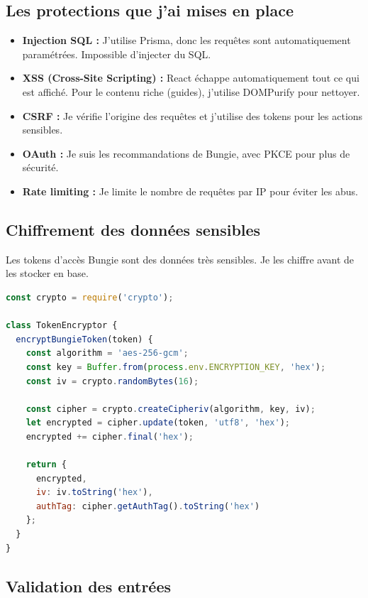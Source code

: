 \subsection{Les protections que j'ai mises en place}

\begin{itemize}
    \item \textbf{Injection SQL :} J'utilise Prisma, donc les requêtes sont automatiquement paramétrées. Impossible d'injecter du SQL.
    \item \textbf{XSS (Cross-Site Scripting) :} React échappe automatiquement tout ce qui est affiché. Pour le contenu riche (guides), j'utilise DOMPurify pour nettoyer.
    \item \textbf{CSRF :} Je vérifie l'origine des requêtes et j'utilise des tokens pour les actions sensibles.
    \item \textbf{OAuth :} Je suis les recommandations de Bungie, avec PKCE pour plus de sécurité.
    \item \textbf{Rate limiting :} Je limite le nombre de requêtes par IP pour éviter les abus.
\end{itemize}

\subsection{Chiffrement des données sensibles}

Les tokens d'accès Bungie sont des données très sensibles. Je les chiffre avant de les stocker en base.

\begin{lstlisting}[language=JavaScript]
const crypto = require('crypto');

class TokenEncryptor {
  encryptBungieToken(token) {
    const algorithm = 'aes-256-gcm';
    const key = Buffer.from(process.env.ENCRYPTION_KEY, 'hex');
    const iv = crypto.randomBytes(16);
    
    const cipher = crypto.createCipheriv(algorithm, key, iv);
    let encrypted = cipher.update(token, 'utf8', 'hex');
    encrypted += cipher.final('hex');
    
    return {
      encrypted,
      iv: iv.toString('hex'),
      authTag: cipher.getAuthTag().toString('hex')
    };
  }
}
\end{lstlisting}

\subsection{Validation des entrées}

